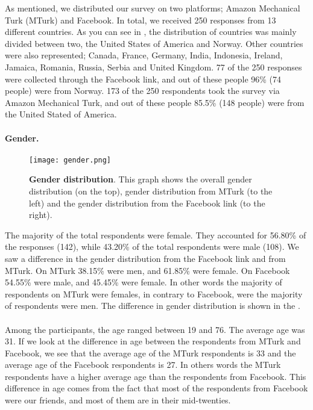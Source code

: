 As mentioned, we distributed our survey on two platforms; Amazon Mechanical Turk (MTurk) and Facebook. In total, we received 250 responses from 13 different countries. As you can see in , the distribution of countries was mainly divided between two, the United States of America and Norway. Other countries were also represented; Canada, France, Germany, India, Indonesia, Ireland, Jamaica, Romania, Russia, Serbia and United Kingdom. 77 of the 250 responses were collected through the Facebook link, and out of these people 96\% (74 people) were from Norway. 173 of the 250 respondents took the survey via Amazon Mechanical Turk, and out of these people 85.5\% (148 people) were from the United Stated of America. 

\paragraph{Gender.}

\begin{figure}[h!]
\centering
\texttt{[image: gender.png]}
\caption[Gender distribution]{\textbf{Gender distribution}. This graph shows the overall gender distribution (on the top), gender distribution from MTurk (to the left) and the gender distribution from the Facebook link (to the right).} 
\label{fig:gender}
\end{figure}

The majority of the total respondents were female. They accounted for 56.80\% of the responses (142), while 43.20\% of the total respondents were male (108). We saw a difference in the gender distribution from the Facebook link and from MTurk. On MTurk 38.15\% were men, and 61.85\% were female. On Facebook 54.55\% were male, and 45.45\% were female. In other words the majority of respondents on MTurk were females, in contrary to Facebook, were the majority of respondents were men. The difference in gender distribution is shown in the .

\paragraph{}
Among the participants, the age ranged between 19 and 76. The average age was 31. If we look at the difference in age between the respondents from MTurk and Facebook, we see that the average age of the MTurk respondents is 33 and the average age of the Facebook respondents is 27. In others words the MTurk respondents have a higher average age than the respondents from Facebook. This difference in age comes from the fact that most of the respondents from Facebook were our friends, and most of them are in their mid-twenties. 


